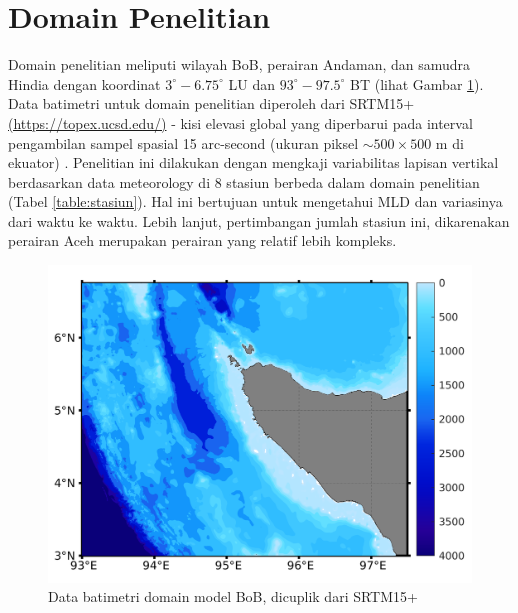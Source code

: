 \vspace{1.5pc}
\section[Domain Penelitian]{Domain Penelitian}
\begin{spacing}{1.5}
	Domain penelitian meliputi wilayah BoB, perairan Andaman, dan samudra Hindia dengan koordinat $3^\circ-6.75^\circ$ LU dan $93^\circ-97.5^\circ$ BT (lihat Gambar \ref{fig:domain}). Data batimetri untuk domain penelitian diperoleh dari SRTM15+ \href{https://topex.ucsd.edu/pub/archive/srtm15/V1/}{(https://topex.ucsd.edu/)} - kisi elevasi global yang diperbarui pada interval pengambilan sampel spasial 15 arc-second (ukuran piksel $\sim 500 \times 500$ m di ekuator) . Penelitian ini dilakukan dengan mengkaji variabilitas lapisan vertikal berdasarkan data meteorology di 8 stasiun berbeda dalam domain penelitian (Tabel \ref{table:stasiun}). Hal ini bertujuan untuk mengetahui MLD dan variasinya dari waktu ke waktu. Lebih lanjut, pertimbangan jumlah stasiun ini, dikarenakan perairan Aceh merupakan perairan yang relatif lebih kompleks. 
	\begin{figure}[H]
		\centering
		\includegraphics[width=15cm]{contents/bathymetri}
		\caption{Data batimetri domain model BoB, dicuplik dari SRTM15+}
		\label{fig:domain}
	\end{figure}
	

\end{spacing}
